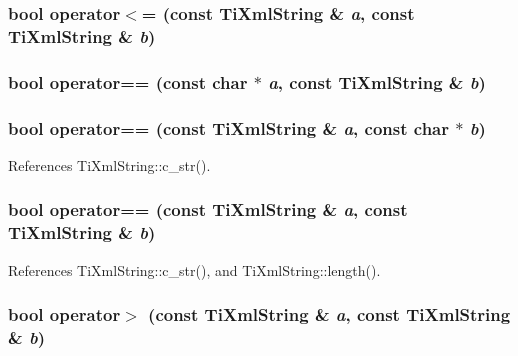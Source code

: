 \subsubsection[operator$<$=]{\setlength{\rightskip}{0pt plus 5cm}bool operator$<$= (const {\bf TiXmlString} \& {\em a}, \/  const {\bf TiXmlString} \& {\em b})\hspace{0.3cm}{\tt  [inline]}}\label{tinystr_8h_b7fa4756616605a2697128067b80ffa5}


\subsubsection[operator==]{\setlength{\rightskip}{0pt plus 5cm}bool operator== (const char $\ast$ {\em a}, \/  const {\bf TiXmlString} \& {\em b})\hspace{0.3cm}{\tt  [inline]}}\label{tinystr_8h_a1ab32fa6995bc5bca0e8c0b305d71a7}


\subsubsection[operator==]{\setlength{\rightskip}{0pt plus 5cm}bool operator== (const {\bf TiXmlString} \& {\em a}, \/  const char $\ast$ {\em b})\hspace{0.3cm}{\tt  [inline]}}\label{tinystr_8h_ce60487cee20f188d1d8c0f4504549da}




References TiXmlString::c\_\-str().
\subsubsection[operator==]{\setlength{\rightskip}{0pt plus 5cm}bool operator== (const {\bf TiXmlString} \& {\em a}, \/  const {\bf TiXmlString} \& {\em b})\hspace{0.3cm}{\tt  [inline]}}\label{tinystr_8h_b43569e63f57a29dbc7deebfee90f98e}




References TiXmlString::c\_\-str(), and TiXmlString::length().
\subsubsection[operator$>$]{\setlength{\rightskip}{0pt plus 5cm}bool operator$>$ (const {\bf TiXmlString} \& {\em a}, \/  const {\bf TiXmlString} \& {\em b})\hspace{0.3cm}{\tt  [inline]}}\label{tinystr_8h_1390d728e894f489d3f02cedbaf53e35}


